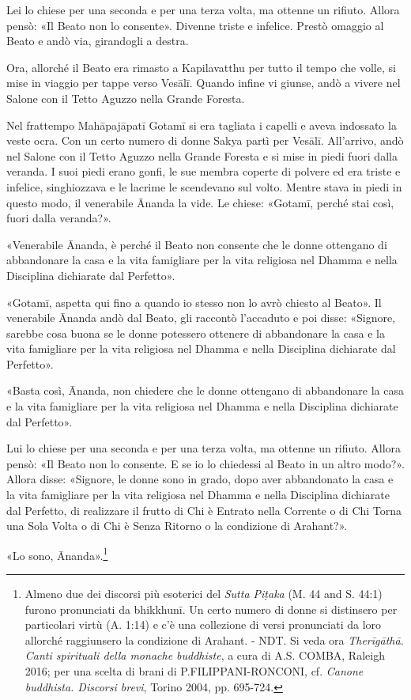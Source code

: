 Lei lo chiese per una seconda e per una terza volta, ma ottenne un
rifiuto. Allora pensò: «Il Beato non lo consente». Divenne triste e
infelice. Prestò omaggio al Beato e andò via, girandogli a destra.


Ora, allorché il Beato era rimasto a Kapilavatthu per tutto il tempo che
volle, si mise in viaggio per tappe verso Vesālī. Quando infine vi
giunse, andò a vivere nel Salone con il Tetto Aguzzo nella Grande
Foresta.


Nel frattempo Mahāpajāpatī Gotamī si era tagliata i capelli e aveva
indossato la veste ocra. Con un certo numero di donne Sakya partì per
Vesālī. All’arrivo, andò nel Salone con il Tetto Aguzzo nella Grande
Foresta e si mise in piedi fuori dalla veranda. I suoi piedi erano
gonfi, le sue membra coperte di polvere ed era triste e infelice,
singhiozzava e le lacrime le scendevano sul volto. Mentre stava in piedi
in questo modo, il venerabile Ānanda la vide. Le chiese: «Gotamī, perché
stai così, fuori dalla veranda?».


«Venerabile Ānanda, è perché il Beato non consente che le donne
ottengano di abbandonare la casa e la vita famigliare per la vita
religiosa nel Dhamma e nella Disciplina dichiarate dal Perfetto».


«Gotamī, aspetta qui fino a quando io stesso non lo avrò chiesto al
Beato». Il venerabile Ānanda andò dal Beato, gli raccontò l’accaduto e
poi disse: «Signore, sarebbe cosa buona se le donne potessero ottenere
di abbandonare la casa e la vita famigliare per la vita religiosa nel
Dhamma e nella Disciplina dichiarate dal Perfetto».


«Basta così, Ānanda, non chiedere che le donne ottengano di abbandonare
la casa e la vita famigliare per la vita religiosa nel Dhamma e nella
Disciplina dichiarate dal Perfetto».


Lui lo chiese per una seconda e per una terza volta, ma ottenne un
rifiuto. Allora pensò: «Il Beato non lo consente. E se io lo chiedessi
al Beato in un altro modo?». Allora disse: «Signore, le donne sono in
grado, dopo aver abbandonato la casa e la vita famigliare per la vita
religiosa nel Dhamma e nella Disciplina dichiarate dal Perfetto, di
realizzare il frutto di Chi è Entrato nella Corrente o di Chi Torna una
Sola Volta o di Chi è Senza Ritorno o la condizione di Arahant?».


«Lo sono, Ānanda».\footnote{Almeno due dei discorsi più esoterici del \emph{Sutta Piṭaka} (M. 44 and S. 44:1) furono pronunciati da bhikkhunī. Un certo numero di donne si distinsero per particolari virtù (A. 1:14) e c’è una collezione di versi pronunciati da loro allorché raggiunsero la condizione di Arahant. - NDT. Si veda ora \emph{Therīgāthā. Canti spirituali della monache buddhiste}, a cura di A.S. COMBA, Raleigh 2016; per una scelta di brani di P.FILIPPANI-RONCONI, cf. \emph{Canone buddhista. Discorsi brevi}, Torino 2004, pp. 695-724.}


